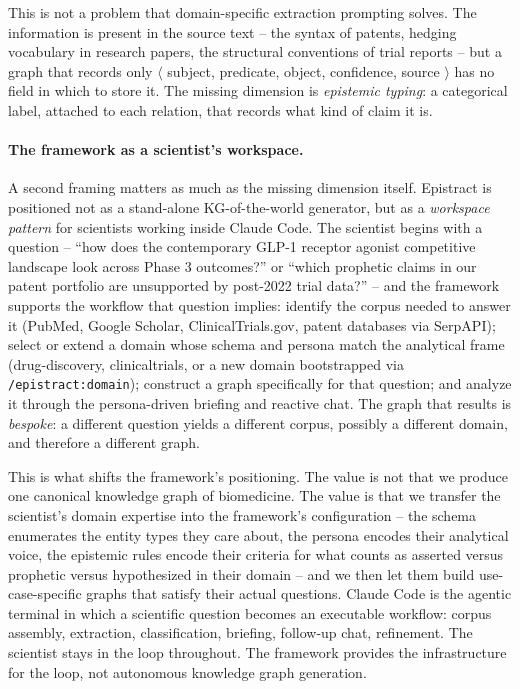 This is not a problem that domain-specific extraction prompting solves. The information is present in the source text -- the syntax of patents, hedging vocabulary in research papers, the structural conventions of trial reports -- but a graph that records only $\langle$ subject, predicate, object, confidence, source $\rangle$ has no field in which to store it. The missing dimension is \emph{epistemic typing}: a categorical label, attached to each relation, that records what kind of claim it is.

\paragraph{The framework as a scientist's workspace.} A second framing matters as much as the missing dimension itself. Epistract is positioned not as a stand-alone KG-of-the-world generator, but as a \emph{workspace pattern} for scientists working inside Claude Code. The scientist begins with a question -- ``how does the contemporary GLP-1 receptor agonist competitive landscape look across Phase 3 outcomes?'' or ``which prophetic claims in our patent portfolio are unsupported by post-2022 trial data?'' -- and the framework supports the workflow that question implies: identify the corpus needed to answer it (PubMed, Google Scholar, ClinicalTrials.gov, patent databases via SerpAPI); select or extend a domain whose schema and persona match the analytical frame (drug-discovery, clinicaltrials, or a new domain bootstrapped via \texttt{/epistract:domain}); construct a graph specifically for that question; and analyze it through the persona-driven briefing and reactive chat. The graph that results is \emph{bespoke}: a different question yields a different corpus, possibly a different domain, and therefore a different graph.

This is what shifts the framework's positioning. The value is not that we produce one canonical knowledge graph of biomedicine. The value is that we transfer the scientist's domain expertise into the framework's configuration -- the schema enumerates the entity types they care about, the persona encodes their analytical voice, the epistemic rules encode their criteria for what counts as asserted versus prophetic versus hypothesized in their domain -- and we then let them build use-case-specific graphs that satisfy their actual questions. Claude Code is the agentic terminal in which a scientific question becomes an executable workflow: corpus assembly, extraction, classification, briefing, follow-up chat, refinement. The scientist stays in the loop throughout. The framework provides the infrastructure for the loop, not autonomous knowledge graph generation.

